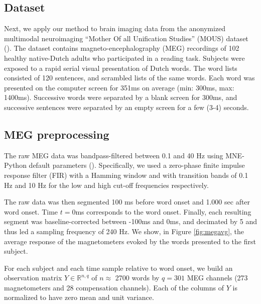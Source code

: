 \newpage
\subsection{Dataset}

Next, we apply our method to brain imaging data from the anonymized multimodal
neuroimaging ``Mother Of all Unification Studies'' (MOUS) dataset
(\cite{schoffelen2019204}).  The dataset contains magneto-encephalography (MEG)
recordings of 102 healthy native-Dutch adults who participated in a reading
task.
%
Subjects were exposed to a rapid serial visual presentation of Dutch words. The
word lists consisted of 120 sentences, and scrambled lists of the same words.
Each word was presented on the computer screen for 351ms on average (min: 300ms,
max: 1400ms).  Successive words were separated by a blank screen for 300ms, and
successive sentences were separated by an empty screen for a few (3-4) seconds.

\subsection{MEG preprocessing}

The raw MEG data was bandpass-filtered between 0.1 and 40 Hz using MNE-Python
default parameters (\cite{gramfort2013meg, gramfort2014mne}). Specifically, we used a zero-phase finite impulse
response filter (FIR) with a Hamming window and with transition bands of 0.1 Hz
and 10 Hz for the low and high cut-off frequencies respectively.

The raw data was then segmented 100 ms before word onset and 1.000 sec after
word onset. Time $t=0$ms corresponds to the word onset. Finally, each resulting
segment was baseline-corrected between -100ms and 0ms, and decimated by 5 and
thus led a sampling frequency of 240 Hz. We show, in Figure \ref{fig:megavg},
the average response of the magnetometers evoked by the words presented to the
first subject.

For each subject and each time sample relative to word onset, we
build an observation matrix $Y \in \mathbb{R}^{n, q}$ of $n\approx$ 2700 words
by $q=301$ MEG channels (273 magnetometers and 28 compensation channels). Each
of the columns of $Y$ is normalized to have zero mean and unit variance.


